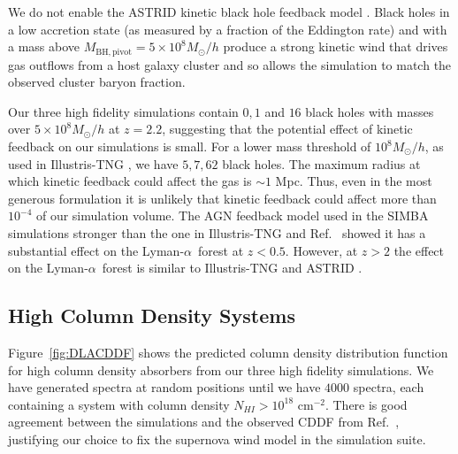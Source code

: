 \documentclass[a4paper,11pt]{article}
\newcommand{\Lya}{Lyman-$\alpha$}
\begin{document}
We do not enable the ASTRID kinetic black hole feedback model \cite{Ni:2023}. Black holes in a low accretion state (as measured by a fraction of the Eddington rate) and with a mass above $M_\mathrm{BH, pivot} = 5\times 10^8 M_\odot/h$ produce a strong kinetic wind that drives gas outflows from a host galaxy cluster and so allows the simulation to match the observed cluster baryon fraction.

Our three high fidelity simulations contain $0, 1$ and $16$ black holes with masses over $5\times 10^8 M_\odot/h$ at $z=2.2$, suggesting that the potential effect of kinetic feedback on our simulations is small. For a lower mass threshold of $10^8 M_\odot/h$, as used in Illustris-TNG \cite{Weinberger:2017}, we have $5, 7, 62$ black holes. The maximum radius at which kinetic feedback could affect the gas is $\sim 1$ Mpc. Thus, even in the most generous formulation it is unlikely that kinetic feedback could affect more than $10^{-4}$ of our simulation volume. The AGN feedback model used in the SIMBA simulations \cite{SIMBA} stronger than the one in Illustris-TNG and Ref.~\cite{Tillman:2022} showed it has a substantial effect on the \Lya~forest at $z < 0.5$. However, at $z > 2$ the effect on the \Lya~forest is similar to Illustris-TNG and ASTRID \cite{Tillman:2023}.


\subsection{High Column Density Systems}
\label{sec:dlas}

Figure~\ref{fig:DLACDDF} shows the predicted column density distribution function for high column density absorbers from our three high fidelity simulations. We have generated spectra at random positions until we have $4000$ spectra, each containing a system with column density $N_{HI} > 10^{18}$ cm$^{-2}$. There is good agreement between the simulations and the observed CDDF from Ref.~\cite{2021MNRAS.507..704H}, justifying our choice to fix the supernova wind model in the simulation suite.
\end{document}
